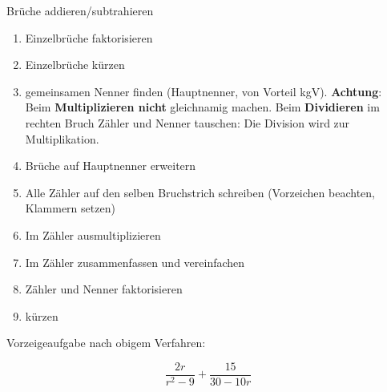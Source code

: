 \begin{rezept}{Brüche addieren/subtrahieren}{}
\begin{enumerate}
	\item Einzelbrüche faktorisieren
	\item Einzelbrüche kürzen
	\item gemeinsamen Nenner finden (Hauptnenner, von Vorteil
	kgV). \textbf{Achtung}: Beim \textbf{Multiplizieren nicht}
	gleichnamig machen. Beim \textbf{Dividieren} im rechten Bruch Zähler
	und Nenner tauschen: Die Division wird zur Multiplikation.
	\item Brüche auf Hauptnenner erweitern
	\item Alle Zähler auf den selben Bruchstrich schreiben (Vorzeichen beachten, Klammern setzen)
	\item Im Zähler ausmultiplizieren
	\item Im Zähler zusammenfassen und vereinfachen
	\item Zähler und Nenner faktorisieren
	\item kürzen
\end{enumerate}
\end{rezept}
\newpage

Vorzeigeaufgabe nach obigem Verfahren:

$$\frac{2r}{r^2-9} + \frac{15}{30-10r}$$



%

